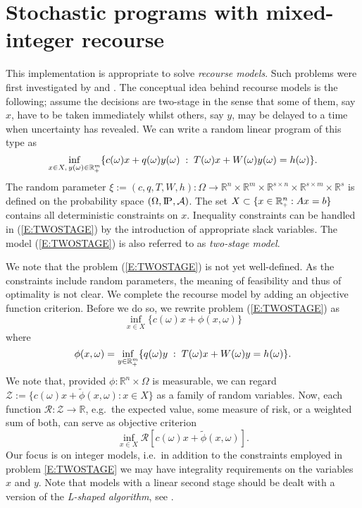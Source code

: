 \documentclass[11pt,draft]{article}
\newcommand{\risk}{{\mathcal{R}}} %
\newcommand{\RI}{{\risk}}
\newcommand{\+}{{\ti{+}}}
\newcommand{\1}{{\ti{1}}}
\newcommand{\R}{\mathbb{R}}
\newcommand{\ie}{i.e.\ }
\newcommand{\st}{\;:\;}
\newcommand{\tends}{\rightarrow}
\newcommand{\Rsn}{{\R^{s \times n}}}
\newcommand{\Rsm}{{\R^{s \times m}}}
\newcommand{\eg}{e.g.\ }
\renewcommand{\P}{{\textsc{I}\!\textsc{P}}}
\newcommand{\Prob}{{\P}}
\begin{document}
\section{Stochastic programs with mixed-integer re\-course}
This implementation is appropriate to solve {\it recourse models}. Such problems
were first investigated by \cite{dant} and \cite{beal}. The conceptual idea behind recourse models is the
following; assume the decisions are two-stage in the sense that some of them, say $x$, have to
be taken immediately whilst others, say $y$, may be delayed to a time when uncertainty has revealed. We
can write a random linear program of this type as
%
\begin{equation} \label{E:TWOSTAGE}
\inf_{x \in X,\,y(\omega) \in \R^m_\+} \{c(\omega)x + q(\omega) y(\omega) \st T(\omega)x +
W(\omega)y(\omega) = h(\omega)\}.
\end{equation}
%
The random parameter $\xi:=(c,q,T,W,h):\Omega \tends \R^n \times \R^m \times \Rsn \times \Rsm
\times \R^s$ is defined on the probability space $(\Omega,\Prob,\mathcal{A})$. The set $X \subset
\{x \in \R_\+^n: Ax = b\}$ contains all deterministic constraints on $x$. Inequality constraints can
be handled in (\ref{E:TWOSTAGE}) by the introduction of appropriate slack variables. 
The model (\ref{E:TWOSTAGE}) is also referred to as {\it two-stage model}. 

We note that the problem (\ref{E:TWOSTAGE}) is not yet well-defined. As the constraints include
random parameters, the meaning of feasibility
and thus of optimality is not clear. We complete the recourse model by adding an objective function
criterion. Before we do so, we rewrite problem (\ref{E:TWOSTAGE}) as
%
\begin{equation} 
\inf_{x \in X} \{c(\omega)x + \phi(x,\omega)\}
\end{equation}
%
where
%
\begin{equation} 
\phi(x,\omega)=\inf_{y \in \R^m_\+} \{q(\omega) y \st T(\omega)x + W(\omega) y = h(\omega) \}.
\end{equation}
%
We note that, provided $\phi: \R^n \times \Omega$ is measurable, we can
regard $\mathcal{Z}:=\{c(\omega)x+ \tilde \phi(x,\omega) : x \in X\}$ as a family of random
variables. Now, each function $\RI: \mathcal{Z} \to \R$, \eg the expected value, some measure of
risk, or a weighted sum of both, can serve as objective criterion
%
\begin{equation} \label{E:TWOSTAGE-}
\inf_{x \in X} \RI[c(\omega)x + \tilde \phi(x,\omega)].
\end{equation}
%
Our focus is on integer models, \ie in addition to the constraints employed in problem
\eqref{E:TWOSTAGE} we may have integrality requirements on the variables $x$ and $y$.
Note that models with a linear second stage should be dealt with a version of the
{\it L-shaped algorithm}, see \cite{bir}.
\end{document}

